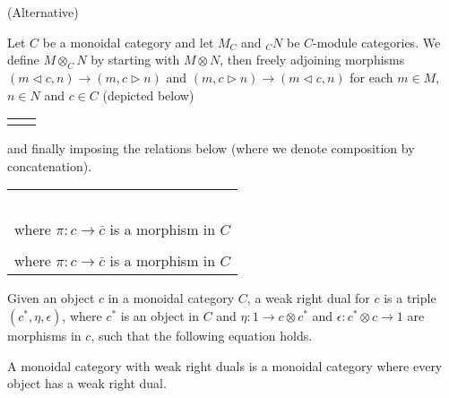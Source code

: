 \begin{definition}(Alternative)
 
  \noindent Let $C$ be a monoidal category and let $M_C$ and $_{C}N$ be
  $C$-module categories. We define $M\otimes_C N$ by starting with $M\otimes
  N$, then freely adjoining morphisms $(m\lhd c, n)\to (m,c\rhd n)$ and
  $(m,c\rhd n)\to (m\lhd c, n)$ for each $m\in M$, $n\in N$ and $c\in C$
  (depicted below)

  \begin{center}
    \begin{tabular}{ll}
     & 

    \end{tabular}
  \end{center}

  and finally imposing the relations below (where we denote composition by
  concatenation).

  \begin{center}
    \begin{tabular}{l}

     \\ \\
     \\ \\
     \\ \\
     where $\pi:c\to\bar{c}$ is a morphism in $C$ \\ \\
     where $\pi:c\to\bar{c}$ is a morphism in $C$
  \end{tabular}
\end{center}

\end{definition}


\begin{definition}
 
  \noindent Given an object $c$ in a monoidal category $C$, a weak right dual
  for $c$ is a triple $(c^*,\eta,\epsilon)$, where $c^*$ is an object in $C$
  and $\eta:1\to c\otimes c^*$ and $\epsilon:c^*\otimes c\to 1$ are morphisms
  in $c$, such that the following equation holds.

  \begin{center}
    
  \end{center}

  A monoidal category with weak right duals is a monoidal category where every
  object has a weak right dual.
\end{definition}


